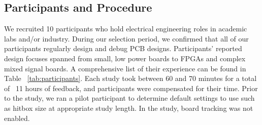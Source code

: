 \documentclass [11pt, proquest] {uwthesis}[2020/02/24]
\begin{document}
\subsection{Participants and Procedure}
We recruited 10 participants who hold electrical engineering roles in academic labs and/or industry. During our selection period, we confirmed that all of our participants regularly design and debug PCB designs. Participants' reported design focuses spanned from small, low power boards to FPGAs and complex mixed signal boards. A comprehensive list of their experience can be found in Table ~\ref{tab:participants}.
Each study took between 60 and 70 minutes for a total of ~11 hours of feedback, and participants were compensated for their time.
{Prior to the study, we ran a pilot participant to determine default settings to use such as hitbox size at appropriate study length. In the study, board tracking was not enabled.}

\end{document}
